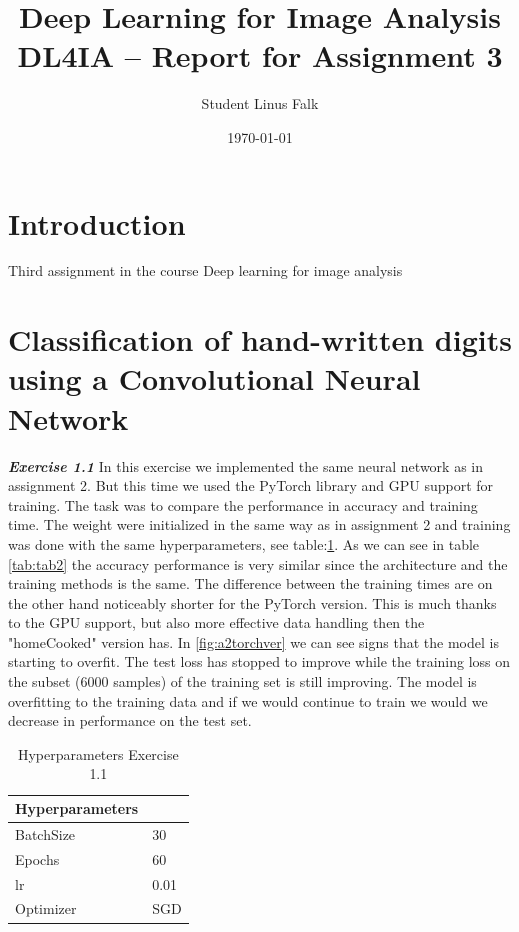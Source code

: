\documentclass[a4paper,10pt]{article}
\title{\textbf{Deep Learning for Image Analysis} 
\\ DL4IA -- Report for Assignment 3}
\author{Student Linus Falk}
\date{\today}
\begin{document}
\lstset{language=Python}
\maketitle

\section*{Introduction}
Third assignment in the course Deep learning for image analysis

\section{Classification of hand-written digits using a Convolutional
Neural Network}

\textit{\textbf{Exercise 1.1}}
In this exercise we implemented the same neural network as in assignment 2. But this time we used the PyTorch library and GPU support for training. The task was to compare the performance in accuracy and training time. The weight were initialized in the same way as in assignment 2 and training was done with the same hyperparameters, see table:\ref{tab:tab1}. As we can see in table \ref{tab:tab2} the accuracy performance is very similar since the architecture and the training methods is the same. The difference between the training times are on the other hand noticeably shorter for the PyTorch version. This is much thanks to the GPU support, but also more effective data handling then the "homeCooked" version has. In \ref{fig:a2torchver} we can see signs that the model is starting to overfit. The test loss has stopped to improve while the training loss on the subset (6000 samples) of the training set is still improving. The model is overfitting to the training data and if we would continue to train we would we decrease in performance on the test set. 

\begin{table}[ht!]
\centering
\begin{tabular}{ll}\hline
 \textbf{Hyperparameters}&    \\ \hline
 BatchSize&  30  \\
 Epochs&  60 \\ 
 lr& 0.01\\
Optimizer& SGD  \\\hline
\end{tabular}
\caption{Hyperparameters Exercise 1.1}
\label{tab:tab1}
\end{table}
\end{document}
